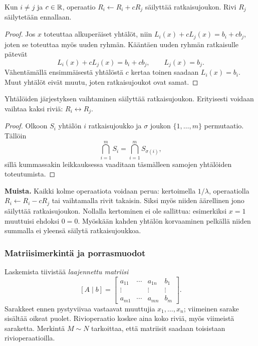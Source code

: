 \documentclass[11pt,a4paper]{amsart}
\begin{document}
  \begin{lemma}
    Kun $i\ne j$ ja $c\in\mathbb{R}$, operaatio
    $R_i\leftarrow R_i+cR_j$ säilyttää ratkaisujoukon.
    Rivi $R_j$ säilytetään ennallaan.
  \end{lemma}
  \begin{proof}
    Jos $x$ toteuttaa alkuperäiset yhtälöt, niin
    $L_i(x)+cL_j(x)=b_i+cb_j$, joten se toteuttaa myös uuden ryhmän.
    Kääntäen uuden ryhmän ratkaisulle pätevät
    \[
      L_i(x)+cL_j(x)=b_i+cb_j,\qquad L_j(x)=b_j.
    \]
    Vähentämällä ensimmäisestä yhtälöstä $c$ kertaa toinen saadaan
    $L_i(x)=b_i$. Muut yhtälöt eivät muutu, joten ratkaisujoukot ovat samat.
  \end{proof}

  \begin{lemma}
    Yhtälöiden järjestyksen vaihtaminen säilyttää ratkaisujoukon.
    Erityisesti voidaan vaihtaa kaksi riviä: $R_i\leftrightarrow R_j$.
  \end{lemma}
  \begin{proof}
    Olkoon $S_i$ yhtälön $i$ ratkaisujoukko ja $\sigma$ joukon
    $\{1,\ldots,m\}$ permutaatio. Tällöin
    \[
      \bigcap_{i=1}^m S_i=\bigcap_{i=1}^m S_{\sigma(i)},
    \]
    sillä kummassakin leikkauksessa vaaditaan täsmälleen samojen
    yhtälöiden toteutumista.
  \end{proof}

  \noindent\textbf{Muista.}
  Kaikki kolme operaatiota voidaan perua: kertoimella $1/\lambda$,
  operaatiolla $R_i\leftarrow R_i-cR_j$ tai vaihtamalla rivit takaisin.
  Siksi myös niiden äärellinen jono säilyttää ratkaisujoukon.
  Nollalla kertominen ei ole sallittua: esimerkiksi $x=1$ muuttuisi
  ehdoksi $0=0$. Myöskään kahden yhtälön korvaaminen pelkällä niiden
  summalla ei yleensä säilytä ratkaisujoukkoa.

  \subsubsection*{Matriisimerkintä ja porrasmuodot}

  Laskemista tiivistää \emph{laajennettu matriisi}
  \[
    [A\mid b]=\left[
      \begin{array}{ccc|c}
        a_{11}&\cdots&a_{1n}&b_1\\
        \vdots&&\vdots&\vdots\\
        a_{m1}&\cdots&a_{mn}&b_m
    \end{array}\right].
  \]
  Sarakkeet ennen pystyviivaa vastaavat muuttujia $x_1,\ldots,x_n$;
  viimeinen sarake sisältää oikeat puolet. Rivioperaatio koskee aina
  koko riviä, myös viimeistä saraketta. Merkintä $M\sim N$ tarkoittaa,
  että matriisit saadaan toisistaan rivioperaatioilla.
\end{document}
